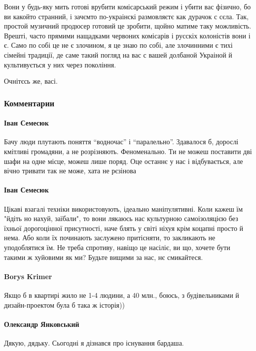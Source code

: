 Вони у будь-яку мить готові врубити комісарський режим і убити вас фізично, бо
ви какойто странний, і зачємто по-украінскі размовляєтє как дурачок с сєла.
Так, простой музичний продюсер готовий це зробити, щойно матиме таку
можливість. Врешті, часто прямими нащадками червоних комісарів і русскіх
колоністів вони і є. Само по собі це не є злочином, я це знаю по собі, але
злочинними є тихі сімейні традиції, де саме такий погляд на вас с вашей
долбаной Украіной й культивується у них через покоління.

Очнітєсь же, васі.

\subsubsection{Комментарии}

\paragraph{Іван Семесюк}

Бачу люди плутають поняття \enquote{водночас} і \enquote{паралельно}. Здавалося б, дорослі
кмітливі громадяни, а не розрізняють. Феноменально. Ти не можеш поставити дві
шафи на одне місце, можеш лише поряд. Оце останнє у нас і відбувається, але
вічно тривати так не може, хата не рєзінова

\paragraph{Іван Семесюк}

Цікаві взагалі техніки використовують, ідеально маніпулятивні. Коли кажеш їм
"йдіть но нахуй, заїбали", то вони лякаюсь нас культурною самоізоляцією без
їхньої дорогоцінної присутності, наче блять у світі ніхуя крім коцапні просто й
нема. Або коли їх починають заслужено притісняти, то закликають не уподоблятися
їм. Не треба спротиву, навіщо це насіліє, ви що, хочете бути такими ж хуйовими
як ми? Будьте вищими за нас, нє смикайтеся.

\paragraph{Borys Krimer}
Якщо б в квартирі жило не 1-4 людини, а 40 млн., боюсь, з будівельниками й
дизайн-проектом була б така ж історія))

\paragraph{Олександр Янковський}
Дякую, дядьку. Сьогодні я дізнався про існування бардаша.

